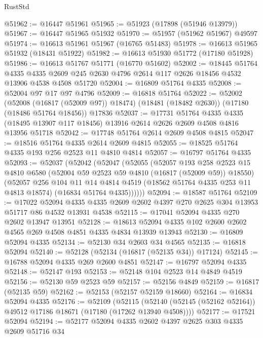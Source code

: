 \begin{lexlean}{RustStd}
\begin{coremodule}
@51962 := @16447 @51961
@51965 := @51923 (@17898 (@51946 @13979))
@51967 := @16447 @51965 @51932
@51970 := @51957 (@51962 @51967) @49597
@51974 := @16613 @51961 @51967 (@16765 @51483)
@51978 := @16613 @51965 @51932 (@18431 @51922)
@51982 := @16613 @51930 @51772 (@17180 @51928)
@51986 := @16613 @51767 @51771 (@16770 @51602)
@52002 := @18445
    @51764
    @4335
    @4335
    @2609
    @245
    @2630
    @4796
    @2614
    @117
    @2626
    @18456
    @4532
    @13906
    @4538
    @4508
    @51720
@52004 := @16809 @51764 @4335
@52008 := @52004 @97 @17 @97 @4796
@52009 := @16818 @51764
@52022 := @52002
    (@52008 (@16817 (@52009 @97)) @18474)
    (@18481 (@18482 @2630))
    (@17180 (@18486 @51764 @18456))
    @17836
@52037 := @17731
    @51764
    @4335
    @4335
    (@18495 @13907 @117 @18456)
    @13916
    @2614
    @2626
    @2609
    @4508
    @4816
    @13956
    @51718
@52042 := @17748 @51764 @2614 @2609 @4508 @4815
@52047 := @18516 @51764 @4335 @2614 @2609 @4815
@52055 := @18525 @51764 @4335 @193 @256 @2523 @11 @4810 @4814
@52057 := @16797 @51764 @4335
@52093 := @52037
    (@52042
      (@52047
        (@52055
          (@52057
            @193
            @258
            @2523
            @15
            @4810
            @6580
            (@52004 @59 @2523 @59 @4810 (@16817 (@52009 @59)) @18550)
            (@52057
              @256
              @104
              @11
              @14
              @4814
              @4519
              (@18562 @51764 @4335 @253 @11 @4813 @18574)
              (@16834 @51764 @4335))))))
@52094 := @18587 @51764
@52109 := @17022
    @52094
    @4335
    @4335
    @2609
    @2602
    @4397
    @270
    @2625
    @304
    @13953
    @51717
    @86
    @4532
    @13931
    @4538
@52115 := @17041 @52094 @4335 @270 @2602 @13947 @13951
@52128 := @18613 @52094 @4335 @102 @2600 @2602 @4565 @269 @4508 @4851 @4335 @4834 @13939 @13943
@52130 := @16809 @52094 @4335
@52134 := @52130 @34 @2603 @34 @4565
@52135 := @16818 @52094
@52140 := @52128 (@52134 (@16817 (@52135 @34)) @17124)
@52145 := @16788 @52094 @4335 @269 @2600 @4851
@52147 := @16797 @52094 @4335
@52148 := @52147 @193
@52153 := @52148 @104 @2523 @14 @4849 @4519
@52156 := @52130 @59 @2523 @59
@52157 := @52156 @4849
@52159 := @16817 (@52135 @59)
@52162 := @52153 (@52157 @52159 @18660)
@52164 := @16834 @52094 @4335
@52176 := @52109
    (@52115 (@52140 (@52145 (@52162 @52164)) @49512 @17186 @18671 (@17180 (@17262 @13940 @4508))))
@52177 := @17521 @52094
@52194 := @52177
    @52094
    @4335
    @2602
    @4397
    @2625
    @303
    @4335
    @2609
    @51716
    @34

\end{coremodule}
\end{lexlean}
